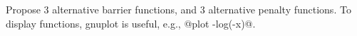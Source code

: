 

\renewcommand{\course}{Optimization}
\renewcommand{\coursepicture}{optim}
\renewcommand{\coursedate}{Summer 2015}
\renewcommand{\exnum}{4}

\exercises










Propose 3 alternative barrier functions, and 3 alternative penalty
functions. To display functions, gnuplot is useful, e.g.,
@plot -log(-x)@.

